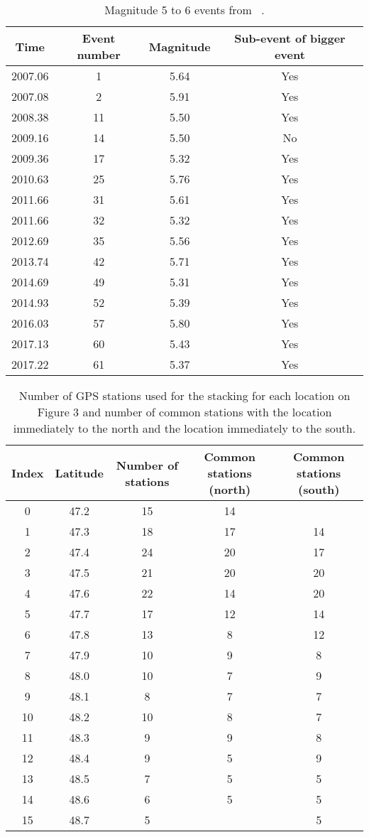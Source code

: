 \documentclass{article}
\begin{document}
 \begin{table}[hbt!]
 \caption{Magnitude 5 to 6 events from ~\citet{MIC_2019}.}
 \centering
 \begin{tabular}{c c c c}
 \hline
 Time & Event number & Magnitude & Sub-event of bigger event \\
 \hline
 2007.06 & 1 & 5.64 & Yes \\
 2007.08 & 2 & 5.91 & Yes \\
 2008.38 & 11 & 5.50 & Yes \\
 2009.16 & 14 & 5.50 & No \\
 2009.36 & 17 & 5.32 & Yes \\
 2010.63 & 25 & 5.76 & Yes \\
 2011.66 & 31 & 5.61 & Yes \\
 2011.66 & 32 & 5.32 & Yes \\
 2012.69 & 35 & 5.56 & Yes \\
 2013.74 & 42 & 5.71 & Yes \\
 2014.69 & 49 & 5.31 & Yes \\
 2014.93 & 52 & 5.39 & Yes \\
 2016.03 & 57 & 5.80 & Yes \\
 2017.13 & 60 & 5.43 & Yes \\
 2017.22 & 61 & 5.37 & Yes \\
 \hline
 \end{tabular}
 \end{table}

 \begin{table}[hbt!]
 \caption{Number of GPS stations used for the stacking for each location on Figure 3 and number of common stations with the location immediately to the north and the location immediately to the south.}
 \centering
 \begin{tabular}{c c c c c}
 \hline
 Index & Latitude & Number of stations & Common stations (north) & Common stations (south) \\
 \hline
0 & 47.2 & 15 & 14 & \\
1 & 47.3 & 18 & 17 & 14 \\
2 & 47.4 & 24 & 20 & 17 \\
3 & 47.5 & 21 & 20 & 20 \\
4 & 47.6 & 22 & 14 & 20 \\
5 & 47.7 & 17 & 12 & 14 \\
6 & 47.8 & 13 & 8 & 12 \\
7 & 47.9 & 10 & 9 & 8 \\
8 & 48.0 & 10 & 7 & 9 \\
9 & 48.1 & 8 & 7 & 7 \\
10 & 48.2 & 10 & 8 & 7 \\
11 & 48.3 & 9 & 9 & 8 \\
12 & 48.4 & 9 & 5 & 9 \\
13 & 48.5 & 7 & 5 & 5 \\
14 & 48.6 & 6 & 5 & 5 \\
15 & 48.7 & 5 & & 5 \\
 \hline
 \end{tabular}
 \end{table}
\end{document}
